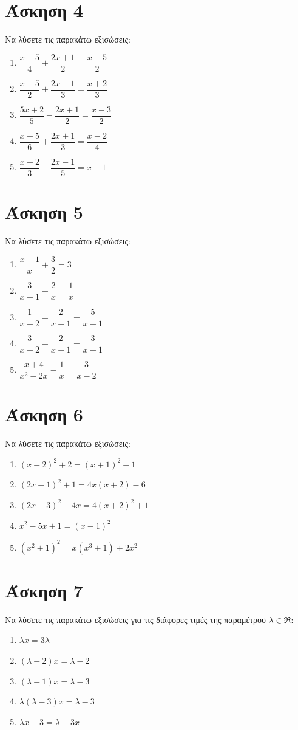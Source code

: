 \documentclass[a4paper,10pt]{report}
\begin{document}
\section*{Άσκηση 4  \hfill \small{}}
Να λύσετε τις παρακάτω εξισώσεις:
\begin{enumerate}[1)]
 \item $\dfrac{x+5}{4}+\dfrac{2x+1}{2}=\dfrac{x-5}{2} $
 \item $\dfrac{x-5}{2}+\dfrac{2x-1}{3}=\dfrac{x+2}{3} $
 \item $\dfrac{5x+2}{5}-\dfrac{2x+1}{2}=\dfrac{x-3}{2} $
 \item $\dfrac{x-5}{6}+\dfrac{2x+1}{3}=\dfrac{x-2}{4} $
 \item $\dfrac{x-2}{3}-\dfrac{2x-1}{5}=x-1$
\end{enumerate}



\section*{Άσκηση 5  \hfill \small{}}
Να λύσετε τις παρακάτω εξισώσεις:
\begin{enumerate}[1)]
  \item $\dfrac{x+1}{x}+\dfrac{3}{2}=3  $
  \item $\dfrac{3}{x+1}-\dfrac{2}{x}=\dfrac{1}{x}  $
  \item $\dfrac{1}{x-2}-\dfrac{2}{x-1}=\dfrac{5}{x-1}  $
  \item $\dfrac{3}{x-2}-\dfrac{2}{x-1}=\dfrac{3}{x-1}  $
  \item $\dfrac{x+4}{x^{2}-2x}-\dfrac{1}{x}=\dfrac{3}{x-2}  $
\end{enumerate}

\section*{Άσκηση 6  \hfill \small{}}
Να λύσετε τις παρακάτω εξισώσεις:
\begin{enumerate}[1)]
  \item $ (x-2)^{2}+2 =(x+1)^{2}+1$
  \item $ (2x-1)^{2}+1=4x(x+2)-6 $
  \item $ (2x+3)^{2}-4x=4(x+2)^{2}+1 $
  \item $ x^{2}-5x+1=(x-1)^{2} $
  \item $ (x^{2}+1)^{2}=x(x^{3}+1)+2x^{2} $        
\end{enumerate}

\section*{Άσκηση 7  \hfill \small{}}
Να λύσετε τις παρακάτω εξισώσεις για τις διάφορες τιμές της παραμέτρου $λ\in \Re$:
\begin{enumerate}[1)]
\item $λx=3λ$
\item $(λ-2)x=λ-2$
\item $(λ-1)x=λ-3$
\item $λ(λ-3)x=λ-3$
\item $λx-3=λ-3x$
\end{enumerate}
\end{document}

